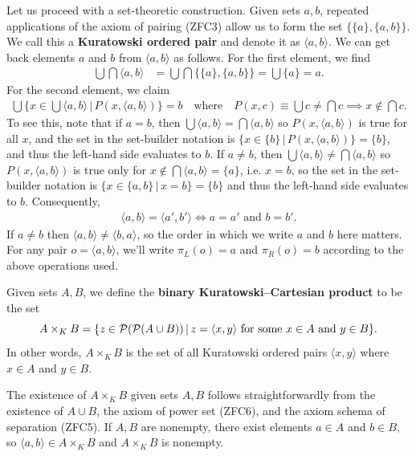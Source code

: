 Let us proceed with a set-theoretic construction. 
Given sets $a, b$, repeated applications of the axiom of pairing (ZFC3) allow us to form the set $\{\{a\}, \{a, b\}\}$.
We call this a \textbf{Kuratowski ordered pair} and denote it as $\langle a, b\rangle$. 
We can get back elements $a$ and $b$ from $\langle a, b\rangle$ as follows.
For the first element, we find
\begin{align*}
	\bigcup\bigcap\langle a, b\rangle &= \bigcup\bigcap \{\{a\}, \{a, b\}\} = \bigcup \{a\} = a.
\end{align*}
For the second element, we claim
\begin{align*}
	\bigcup\Big\{ x\in \bigcup\langle a, b\rangle \,|\, P(x, \langle a, b\rangle) \Big\} = b \quad\text{where}\quad P(x, c)\equiv \bigcup c \ne \bigcap c \implies x\notin\bigcap c.
\end{align*}
To see this, note that if $a = b$, then $\bigcup\langle a, b\rangle = \bigcap\langle a, b\rangle$ so $P(x, \langle a, b\rangle)$ is true for all $x$, and the set in the set-builder notation is $\{ x\in\{b\} \,|\, P(x, \langle a, b\rangle) \} = \{b\}$, and thus the left-hand side evaluates to $b$. 
If $a\ne b$, then $\bigcup\langle a, b\rangle \ne \bigcap\langle a, b\rangle$ so $P(x, \langle a, b\rangle)$ is true only for $x\notin\bigcap\langle a, b\rangle = \{a\}$, i.e. $x = b$, so the set in the set-builder notation is $\{ x\in\{a, b\} \,|\, x=b \} = \{b\}$ and thus the left-hand side evaluates to $b$. 
Consequently, 
\begin{align}\label{ch1eqn_kuratowski_pair_property}
	\langle a, b\rangle = \langle a', b'\rangle \iff a = a' \text{ and } b = b'.
\end{align}
If $a\ne b$ then $\langle a, b\rangle\ne \langle b, a\rangle$, so the order in which we write $a$ and $b$ here matters. 
For any pair $o = \langle a, b\rangle$, we'll write $\pi_{L}(o) = a$ and $\pi_{R}(o) = b$ according to the above operations used. 

\begin{definition}
	Given sets $A, B$, we define the \textbf{binary Kuratowski--Cartesian product} to be the set
	\[ A\times_{K} B = \{ z\in\mathcal{P}(\mathcal{P}(A\cup B)) \,|\, \text{$z = \langle x, y\rangle$ for some $x\in A$ and $y\in B$} \}. \]
	In other words, $A\times_{K} B$ is the set of all Kuratowski ordered pairs $\langle x, y\rangle$ where $x\in A$ and $y\in B$. 
\end{definition}

The existence of $A\times_{K} B$ given sets $A, B$ follows straightforwardly from the existence of $A\cup B$, the axiom of power set (ZFC6), and the axiom schema of separation (ZFC5).
If $A, B$ are nonempty, there exist elements $a\in A$ and $b\in B$, so $\langle a, b\rangle\in A\times_{K} B$ and $A\times_{K} B$ is nonempty. 

